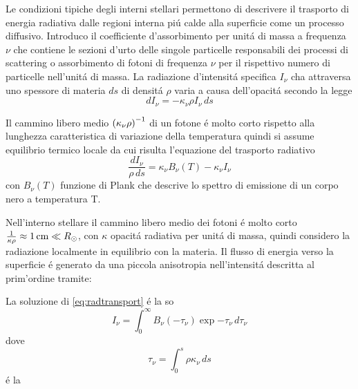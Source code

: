 \documentclass[../main.tex]{subfiles}
\begin{document}
\begin{workout}

Le condizioni tipiche degli interni stellari permettono di descrivere il trasporto di energia radiativa dalle regioni interna pi\'u calde alla superficie come un processo diffusivo. Introduco il coefficiente d'assorbimento per unit\'a di massa a frequenza $\nu$ che contiene le sezioni d'urto delle singole particelle responsabili dei processi di scattering o assorbimento di fotoni di frequenza $\nu$ per il rispettivo numero di particelle nell'unit\'a di massa. La radiazione d'intensit\'a specifica $I_{\nu}$ cha attraversa uno spessore di materia $ds$ di densit\'a $\rho$ varia a causa dell'opacit\'a secondo la legge
\begin{equation}
dI_{\nu}=-\kappa_{\nu}\rho I_{\nu}\,ds
\end{equation}

Il cammino libero medio ${(\kappa_{\nu}\rho)}^{-1}$ di un fotone \'e molto corto rispetto alla lunghezza caratteristica di variazione della temperatura quindi si assume equilibrio termico locale da cui risulta l'equazione del trasporto radiativo
\begin{equation}\label{eq:radtransport}
\frac{dI_{\nu}}{\rho\,ds}=\kappa_{\nu}B_{\nu}(T)-\kappa_{\nu}I_{\nu}
\end{equation}
con $B_{\nu}(T)$ funzione di Plank che descrive lo spettro di emissione di un corpo nero a temperatura T.
\end{workout}

\begin{errata}

Nell'interno stellare il cammino libero medio dei fotoni \'e molto corto $\frac{1}{\kappa\rho}\approx\SI{1}{\cm}\ll \rsun{}$, con $\kappa$ opacit\'a radiativa per unit\'a di massa, quindi considero la radiazione localmente in equilibrio con la materia. Il flusso di energia verso la superficie \'e generato da una piccola anisotropia nell'intensit\'a descritta al prim'ordine tramite:

\end{errata}

\begin{workout}

La soluzione di \eqref{eq:radtransport} \'e la so
\begin{equation}
I_{\nu}=\int_0^{\infty}B_{\nu}(-\tau_{\nu})\exp{-\tau_{\nu}}\,d\tau_{\nu}
\end{equation}
dove
\begin{equation}
\tau_{\nu}=\int_0^s\rho\kappa_{\nu}\,ds
\end{equation}
\'e la

\end{workout}
\end{document}
